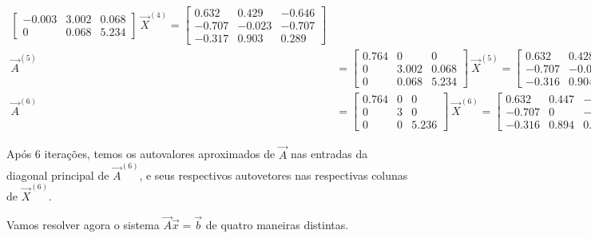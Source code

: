 \documentclass{homework}
\begin{document}
\begin{align*}
\begin{bmatrix}
		-0.003 & 3.002 & 0.068\\
		0 & 0.068 & 5.234
		\end{bmatrix}~
		\vec{X}^{(4)} = \begin{bmatrix}
		0.632 & 0.429 & -0.646\\
		-0.707 & -0.023 & -0.707\\
		-0.317 & 0.903 & 0.289
		\end{bmatrix}\\[1cm]
		\vec{A}^{(5)} &= \begin{bmatrix}
		0.764 & 0 & 0\\
		0 & 3.002 & 0.068\\
		0 & 0.068 & 5.234
		\end{bmatrix}~
		\vec{X}^{(5)} = \begin{bmatrix}
		0.632 & 0.428 & -0.646\\
		-0.707 & -0.022 & -0.707\\
		-0.316 & 0.904 & 0.289
		\end{bmatrix}\\[1cm]
		\vec{A}^{(6)} &= \begin{bmatrix}
		0.764 & 0 & 0\\
		0 & 3 & 0\\
		0 & 0 & 5.236
		\end{bmatrix}~
		\vec{X}^{(6)} = \begin{bmatrix}
		0.632 & 0.447 & -0.632\\
		-0.707 & 0 & -0.707\\
		-0.316 & 0.894 & 0.316
		\end{bmatrix}
		\end{align*}
		
		Após 6 iterações, temos os autovalores aproximados de $\vec{A}$ nas entradas da diagonal principal de $\vec{A}^{(6)}$, e seus respectivos autovetores nas respectivas colunas de $\vec{X}^{(6)}$.
		
		\subsubquest Vamos resolver agora o sistema $\vec{A}\vec{x} = \vec{b}$ de quatro maneiras distintas.
		
\end{document}
